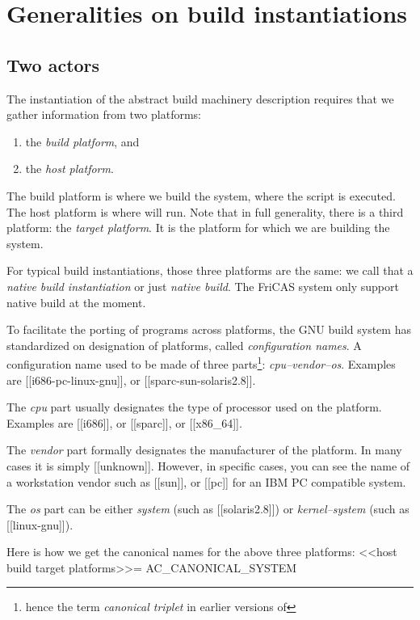 \documentclass[12pt]{article}
\begin{document}
\section{Generalities on build instantiations}

\subsection{Two actors}

The instantiation of the abstract build machinery description requires
that we gather information from two platforms:
\begin{enumerate}
\item the \emph{build platform}, and
\item the \emph{host platform}.
\end{enumerate}

The build platform is where we build the system, \eg{} where
the  script is executed.  The host platform
is where  will run.  Note that in full generality, there is
a third platform: the \emph{target platform}.  It is the platform for which
we are building the system.

For typical build instantiations, those  three  platforms are the same: we
call that a \emph{native build instantiation} or just \emph{native build}.
The FriCAS system only support native build at the moment.

To facilitate the porting of programs across platforms, the GNU build
system has standardized on designation of platforms, called
\emph{configuration names}.  A configuration name used to be
made of three parts\footnote{hence the term \emph{canonical triplet} in
    earlier versions of }:
\textsl{cpu--vendor--os}.  Examples are
[[i686-pc-linux-gnu]], or [[sparc-sun-solaris2.8]].

The \textsl{cpu}
part usually designates the type of processor used on the platform.
Examples are [[i686]], or [[sparc]], or [[x86_64]].

The \textsl{vendor} part formally designates the manufacturer of
the platform.  In many cases it is simply [[unknown]].  However,
in specific cases, you can see the name of a workstation vendor such
as [[sun]], or [[pc]] for an IBM PC compatible system.

The \textsl{os} part can be either \textsl{system} (such as [[solaris2.8]])
or \textsl{kernel--system} (such as [[linux-gnu]]).

Here is how we get the canonical names for the above three platforms:
<<host build target platforms>>=
AC_CANONICAL_SYSTEM
\end{document}
